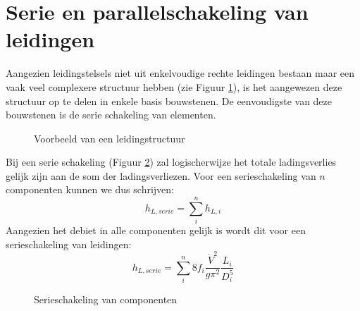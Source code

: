 	\section{Serie en parallelschakeling van leidingen}
	\label{sec:Serie en parallelschakeling van leidingen}
Aangezien leidingstelsels niet uit enkelvoudige rechte leidingen bestaan maar een vaak veel complexere structuur hebben (zie Figuur \ref{fig:leiding_structuur}), is het aangewezen deze structuur op te delen in enkele basis bouwstenen. De eenvoudigste van deze bouwstenen is de serie schakeling van elementen.
\begin{figure}
	\centering
	
	\caption{Voorbeeld van een leidingstructuur}
	\label{fig:leiding_structuur}
\end{figure}
Bij een serie schakeling (Figuur \ref{fig:serieschakeling}) zal logischerwijze het totale ladingsverlies gelijk zijn aan de som der ladingsverliezen. Voor een serieschakeling van $n$ componenten kunnen we dus schrijven:
\begin{equation}
h_{L,serie} = \sum_i^n h_{L,i}
\end{equation}
Aangezien het debiet in alle componenten gelijk is wordt dit voor een serieschakeling van leidingen:
\begin{equation}
	h_{L,serie} = \sum_i^n 8 f_i \frac{\dot{V}^2}{g \pi^2} \frac{L_i}{D^5_i}
	\label{eqn:ladingsverlies door leidingen in serie}
\end{equation}
\begin{figure}
	\centering
	
	\caption{Serieschakeling van componenten}
	\label{fig:serieschakeling}
\end{figure}

